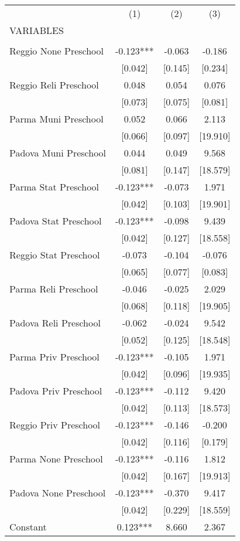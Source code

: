 \begin{tabular}{lccc} \hline
 & (1) & (2) & (3) \\
VARIABLES &  &  &  \\ \hline
 &  &  &  \\
Reggio None Preschool & -0.123*** & -0.063 & -0.186 \\
 & [0.042] & [0.145] & [0.234] \\
Reggio Reli Preschool & 0.048 & 0.054 & 0.076 \\
 & [0.073] & [0.075] & [0.081] \\
Parma Muni Preschool & 0.052 & 0.066 & 2.113 \\
 & [0.066] & [0.097] & [19.910] \\
Padova Muni Preschool & 0.044 & 0.049 & 9.568 \\
 & [0.081] & [0.147] & [18.579] \\
Parma Stat Preschool & -0.123*** & -0.073 & 1.971 \\
 & [0.042] & [0.103] & [19.901] \\
Padova Stat Preschool & -0.123*** & -0.098 & 9.439 \\
 & [0.042] & [0.127] & [18.558] \\
Reggio Stat Preschool & -0.073 & -0.104 & -0.076 \\
 & [0.065] & [0.077] & [0.083] \\
Parma Reli Preschool & -0.046 & -0.025 & 2.029 \\
 & [0.068] & [0.118] & [19.905] \\
Padova Reli Preschool & -0.062 & -0.024 & 9.542 \\
 & [0.052] & [0.125] & [18.548] \\
Parma Priv Preschool & -0.123*** & -0.105 & 1.971 \\
 & [0.042] & [0.096] & [19.935] \\
Padova Priv Preschool & -0.123*** & -0.112 & 9.420 \\
 & [0.042] & [0.113] & [18.573] \\
Reggio Priv Preschool & -0.123*** & -0.146 & -0.200 \\
 & [0.042] & [0.116] & [0.179] \\
Parma None Preschool & -0.123*** & -0.116 & 1.812 \\
 & [0.042] & [0.167] & [19.913] \\
Padova None Preschool & -0.123*** & -0.370 & 9.417 \\
 & [0.042] & [0.229] & [18.559] \\
Constant & 0.123*** & 8.660 & 2.367 \\

\end{tabular}
